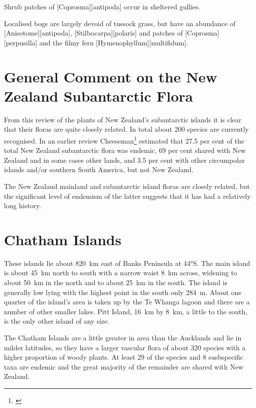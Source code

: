 Shrub patches of [Coprosma][antipoda] occur in sheltered gullies.

Localised bogs are largely devoid of tussock grass, but have an abundance of [Anisotome][antipoda], [Stilbocarpa][polaris] and patches of [Coprosma][perpusilla] and the filmy fern [Hymenophyllum][multifidum].

\section{General Comment on the New Zealand Subantarctic Flora}

From this review of the plants of New Zealand's subantarctic islands it is clear that their floras are quite closely related.
In total about 200 species are currently recognised.
In an earlier review Cheeseman\footnote{\cite{cheeseman1909systematic}} estimated that 27.5 per cent of the total New Zealand subantarctic flora was endemic, 69 per cent shared with New Zealand and in some cases other lands, and 3.5 per cent with other circumpolar islands and/or southern South America, but not New Zealand.

The New Zealand mainland and subantarctic island floras are closely related, but the significant level of endemism of the latter suggests that it has had a relatively long history.

\section{Chatham Islands}

These islands lie about \SI{820}{\kilo\metre} east of Banks Peninsula at \ang{44}S.
The main island is about \SI{45}{\kilo\metre} north to south with a narrow waist \SI{8}{\kilo\metre} across, widening to about \SI{50}{\kilo\metre} in the north and to about \SI{25}{\kilo\metre} in the south.
The island is generally low lying with the highest point in the south only \SI{284}{\metre}.
About one quarter of the island's area is taken up by the Te Whanga lagoon and there are a number of other smaller lakes.
Pitt Island, \SI{16}{\kilo\metre} by \SI{8}{\kilo\metre}, a little to the south, is the only other island of any size.

The Chatham Islands are a little greater in area than the Aucklands and lie in milder latitudes, so they have a larger vascular flora of about 320 species with a higher proportion of woody plants.
At least 29 of the species and 8 susbspecific taxa are endemic and the great majority of the remainder are shared with New Zealand.

